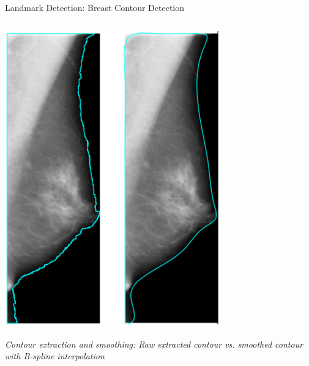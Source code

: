 \documentclass[8pt,aspectratio=169,xcolor=dvipsnames]{beamer}
\begin{document}
\begin{frame}{Landmark Detection: Breast Contour Detection}
\begin{columns}
        \begin{column}{0.45\textwidth}
            \centering
            \includegraphics[width=0.7\textwidth]{contour.png}
            
            \tiny
            \textit{Contour extraction and smoothing: Raw extracted contour vs. smoothed contour with B-spline interpolation}
        \end{column}
    \end{columns}
    
\end{frame}
\end{document}
